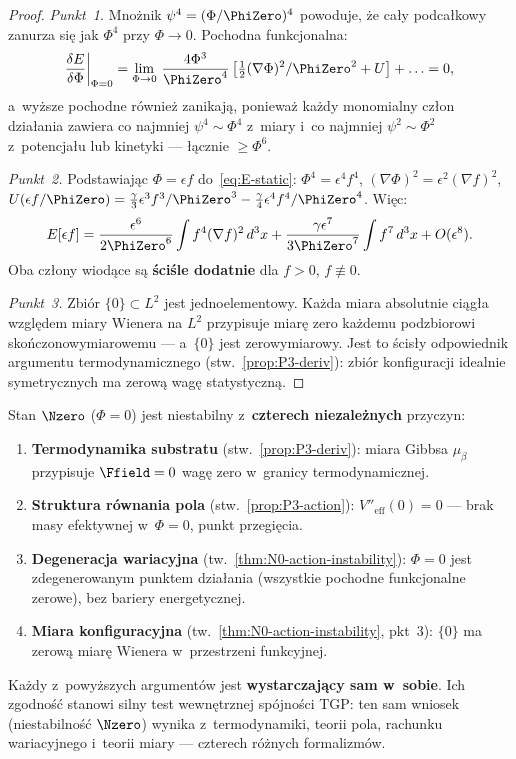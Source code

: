 \begin{proof}
\emph{Punkt~1.}\;
Mno\.znik $\psi^4 = (\Phi/\PhiZero)^4$ powoduje, \.ze ca\l{}y
podca\l{}kowy zanurza si\k{e} jak $\Phi^4$ przy $\Phi \to 0$.
Pochodna funkcjonalna:
\[
  \frac{\delta E}{\delta\Phi}\bigg|_{\Phi=0}
  = \lim_{\Phi\to 0}\,\frac{4\Phi^3}{\PhiZero^4}\,
  \bigl[\tfrac{1}{2}(\nabla\Phi)^2/\PhiZero^2 + U\bigr]
  + \ldots = 0,
\]
a~wy\.zsze pochodne r\'ownie\.z zanikaj\k{a}, poniewa\.z
ka\.zdy monomialny cz\l{}on dzia\l{}ania zawiera co najmniej
$\psi^4 \sim \Phi^4$ z~miary i~co najmniej $\psi^2 \sim \Phi^2$
z~potencja\l{}u lub kinetyki --- \l{}\k{a}cznie $\ge \Phi^6$.

\emph{Punkt~2.}\;
Podstawiaj\k{a}c $\Phi = \epsilon f$ do~\eqref{eq:E-static}:
$\Phi^4 = \epsilon^4 f^4$, $(\nabla\Phi)^2 = \epsilon^2(\nabla f)^2$,
$U(\epsilon f/\PhiZero) = \frac{\gamma}{3}\epsilon^3 f^3/\PhiZero^3
- \frac{\gamma}{4}\epsilon^4 f^4/\PhiZero^4$.
Wi\k{e}c:
\[
  E[\epsilon f] = \frac{\epsilon^6}{2\PhiZero^6}\int f^4(\nabla f)^2\,d^3x
  + \frac{\gamma\epsilon^7}{3\PhiZero^7}\int f^7\,d^3x
  + O(\epsilon^8).
\]
Oba cz\l{}ony wiod\k{a}ce s\k{a} \textbf{\'sci\'sle dodatnie}
dla $f > 0$, $f \not\equiv 0$.

\emph{Punkt~3.}\;
Zbi\'or $\{0\} \subset L^2$ jest jednoelementowy.
Ka\.zda miara absolutnie ci\k{a}g\l{}a wzgl\k{e}dem
miary Wienera na $L^2$ przypisuje miar\k{e} zero
ka\.zdemu podzbiorowi sko\'nczonowymiarowemu ---
a~$\{0\}$ jest zerowymiarowy. Jest to \'scis\l{}y
odpowiednik argumentu termodynamicznego
(stw.~\ref{prop:P3-deriv}): zbi\'or konfiguracji
idealnie symetrycznych ma zerow\k{a} wag\k{e}
statystyczn\k{a}.
\end{proof}

\begin{corollary}\label{cor:N0-quadruple}
Stan $\Nzero$ ($\Phi = 0$) jest niestabilny
z~\textbf{czterech niezale\.znych} przyczyn:
\begin{enumerate}[nosep]
  \item \textbf{Termodynamika substratu}
    (stw.~\ref{prop:P3-deriv}): miara Gibbsa $\mu_\beta$
    przypisuje $\Ffield = 0$ wag\k{e} zero
    w~granicy termodynamicznej.
  \item \textbf{Struktura r\'ownania pola}
    (stw.~\ref{prop:P3-action}): $V''_{\mathrm{eff}}(0) = 0$
    --- brak masy efektywnej w~$\Phi = 0$, punkt
    przegi\k{e}cia.
  \item \textbf{Degeneracja wariacyjna}
    (tw.~\ref{thm:N0-action-instability}): $\Phi = 0$
    jest zdegenerowanym punktem dzia\l{}ania (wszystkie
    pochodne funkcjonalne zerowe), bez bariery energetycznej.
  \item \textbf{Miara konfiguracyjna}
    (tw.~\ref{thm:N0-action-instability}, pkt~3):
    $\{0\}$ ma zerow\k{a} miar\k{e} Wienera
    w~przestrzeni funkcyjnej.
\end{enumerate}
Ka\.zdy z~powy\.zszych argument\'ow jest \textbf{wystarczaj\k{a}cy
sam w~sobie}. Ich zgodno\'s\'c stanowi silny test
wewn\k{e}trznej sp\'ojno\'sci TGP: ten sam wniosek
(niestabilno\'s\'c $\Nzero$) wynika z~termodynamiki,
teorii pola, rachunku wariacyjnego i~teorii miary
--- czterech r\'o\.znych formalizm\'ow.
\end{corollary}

